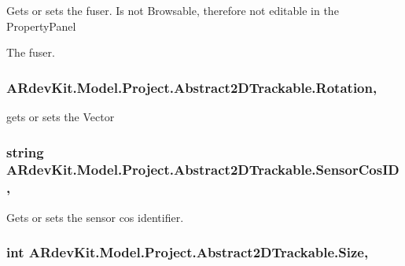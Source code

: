 Gets or sets the fuser. Is not Browsable, therefore not editable in the Property\-Panel 

The fuser. \hypertarget{class_a_rdev_kit_1_1_model_1_1_project_1_1_abstract2_d_trackable_a12ba493972e7d277e8f67294beb70355}{
\subsubsection[{Rotation}]{ A\-Rdev\-Kit.\-Model.\-Project.\-Abstract2\-D\-Trackable.\-Rotation\hspace{0.3cm}{\ttfamily [get]}, {\ttfamily [set]}}}\label{class_a_rdev_kit_1_1_model_1_1_project_1_1_abstract2_d_trackable_a12ba493972e7d277e8f67294beb70355}


gets or sets the Vector 

\hypertarget{class_a_rdev_kit_1_1_model_1_1_project_1_1_abstract2_d_trackable_a9578380939f19267cc7372ca19ff936f}{
\subsubsection[{Sensor\-Cos\-I\-D}]{\setlength{\rightskip}{0pt plus 5cm}string A\-Rdev\-Kit.\-Model.\-Project.\-Abstract2\-D\-Trackable.\-Sensor\-Cos\-I\-D\hspace{0.3cm}{\ttfamily [get]}, {\ttfamily [set]}}}\label{class_a_rdev_kit_1_1_model_1_1_project_1_1_abstract2_d_trackable_a9578380939f19267cc7372ca19ff936f}


Gets or sets the sensor cos identifier. 

\hypertarget{class_a_rdev_kit_1_1_model_1_1_project_1_1_abstract2_d_trackable_a0c9a459cf25e74c8173564d476021c9a}{
\subsubsection[{Size}]{\setlength{\rightskip}{0pt plus 5cm}int A\-Rdev\-Kit.\-Model.\-Project.\-Abstract2\-D\-Trackable.\-Size\hspace{0.3cm}{\ttfamily [get]}, {\ttfamily [set]}}}\label{class_a_rdev_kit_1_1_model_1_1_project_1_1_abstract2_d_trackable_a0c9a459cf25e74c8173564d476021c9a}


